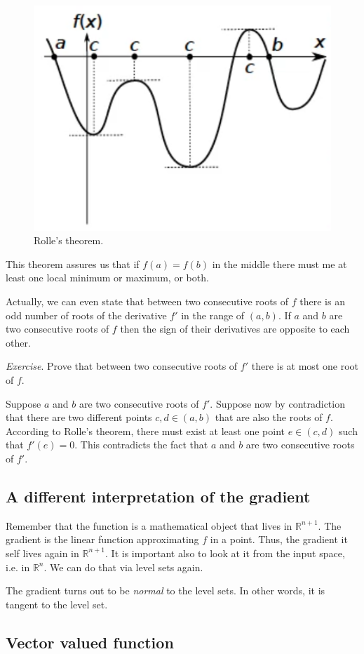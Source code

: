 \begin{figure}
    \centering
    \includegraphics[scale=0.3]{figures/1/chapter1-rolles_theorem1.png}
    \caption{Rolle's theorem.}
    \label{fig:chapter1-rolles_theorem1}
\end{figure}
This theorem assures us that if $f(a) = f(b)$ in the middle there must me at least one local minimum or maximum, or both.
\par Actually, we can even state that between two consecutive roots of $f$ there is an odd number of roots of the derivative $f'$ in the range of $(a,b)$. If $a$ and $b$ are two consecutive roots of $f$ then the sign of their derivatives are opposite to each other.
\par \textit{Exercise}. Prove that between two consecutive roots of $f'$ there is at most one root of $f$.
\par Suppose $a$ and $b$ are two consecutive roots of $f'$. Suppose now by contradiction that there are two different points $c,d \in (a,b)$ that are also the roots of $f$. According to Rolle's theorem, there must exist at least one point $e \in (c,d)$ such that $f'(e)=0$. This contradicts the fact that $a$ and $b$ are two consecutive roots of $f'$.

\subsection{A different interpretation of the gradient}
\par Remember that the function is a mathematical object that lives in $\mathbb{R}^{n+1}$. The gradient is the linear function approximating $f$ in a point. Thus, the gradient it self lives again in $\mathbb{R}^{n+1}$. It is important also to look at it from the input space, i.e. in $\mathbb{R}^n$. We can do that via level sets again.
\par The gradient turns out to be \textit{normal} to the level sets. In other words, it is tangent to the level set.
\subsection{Vector valued function}